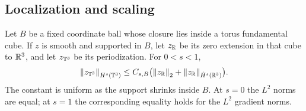 \subsection{Localization and scaling}\label{sec:packet}
\begin{lemma}\label{lem:localization}
Let $B$ be a fixed coordinate ball whose closure lies inside a torus fundamental cube. If $z$ is smooth and supported in $B$, let $z_{\mathbb R}$ be its zero extension in that cube to $\mathbb R^3$, and let $z_{\mathbb T^3}$ be its periodization. For $0<s<1$,
\begin{equation}\label{eq:localization}
 \left\lVert z_{\mathbb T^3}\right\rVert_{H^s(\mathbb T^3)}
 \le C_{s,B}\bigl(\left\lVert z_{\mathbb R}\right\rVert_2+
                   \left\lVert z_{\mathbb R}\right\rVert_{\dot H^s(\mathbb R^3)}\bigr).
\end{equation}
The constant is uniform as the support shrinks inside $B$. At $s=0$ the $L^2$ norms are equal; at $s=1$ the corresponding equality holds for the $L^2$ gradient norms.
\end{lemma}

